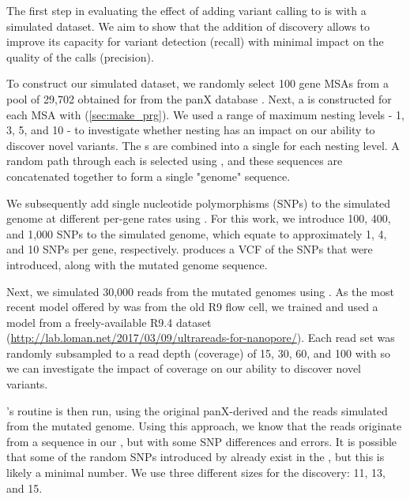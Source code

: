 The first step in evaluating the effect of adding \denovo{} variant calling to \pandora{} is with a simulated dataset. We aim to show that the addition of \denovo{} discovery allows \pandora{} to improve its capacity for variant detection (recall) with minimal impact on the quality of the calls (precision). 

To construct our simulated dataset, we randomly select 100 gene MSAs from a pool of 29,702 obtained for \ecoli{} from the panX database \cite{panx}. Next, a \prg{} is constructed for each MSA with \makeprg{} (\autoref{sec:make_prg}). We used a range of \makeprg{} maximum nesting levels - 1, 3, 5, and 10 - to investigate whether \prg{} nesting has an impact on our ability to discover novel variants. The \prg{}s are combined into a single \panrg{} for each nesting level. A random path through each \prg{} is selected using \pandora{}, and these sequences are concatenated together to form a single "genome" sequence. 

We subsequently add single nucleotide polymorphisms (SNPs) to the simulated genome at different per-gene rates using  \cite{snpmutator}. For this work, we introduce 100, 400, and 1,000 SNPs to the simulated genome, which equate to approximately 1, 4, and 10 SNPs per gene, respectively.  produces a VCF of the SNPs that were introduced, along with the mutated genome sequence.

Next, we simulated 30,000 \ont{} reads from the mutated genomes using  \cite{yang2017,brinda2018}. As the most recent model offered by  was from the old R9 \ont{} flow cell, we trained and used a model from a freely-available \ecoli{} R9.4 dataset (\url{http://lab.loman.net/2017/03/09/ultrareads-for-nanopore/}). Each read set was randomly subsampled to a read depth (coverage) of 15, 30, 60, and 100 with  \cite{rasusa2019} so we can investigate the impact of coverage on our ability to discover novel variants.

\pandora{}'s  routine is then run, using the original panX-derived \panrg{} and the reads simulated from the mutated genome. Using this approach, we know that the reads originate from a sequence in our \panrg{}, but with some SNP differences and \ont{} errors. It is possible that some of the random SNPs introduced by  already exist in the \panrg{}, but this is likely a minimal number. We use three different \kmer{} sizes for the \denovo{} discovery: 11, 13, and 15. 

